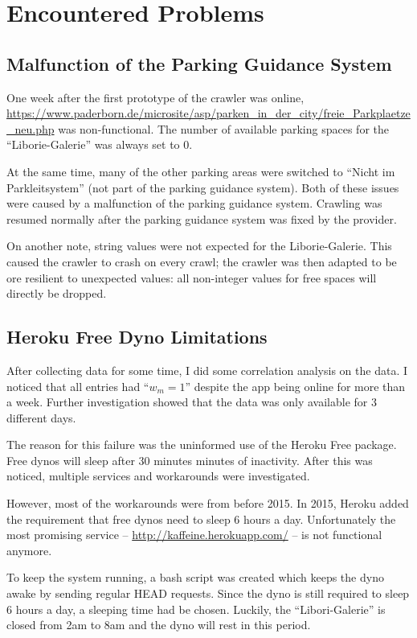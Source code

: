 \documentclass[journal,10pt]{IEEEtran}
\newcommand{\wom}{w_m}
\begin{document}
\section{Encountered Problems}
\subsection{Malfunction of the Parking Guidance System}
One week after the first prototype of the crawler was online, \url{https://www.paderborn.de/microsite/asp/parken_in_der_city/freie_Parkplaetze_neu.php} was non-functional. The number of available parking spaces for the ``Liborie-Galerie'' was always set to \(0\).

At the same time, many of the other parking areas were switched to ``Nicht im Parkleitsystem'' (not part of the parking guidance system). Both of these issues were caused by a malfunction of the parking guidance system. Crawling was resumed normally after the parking guidance system was fixed by the provider.

On another note, string values were not expected for the Liborie-Galerie. This caused the crawler to crash on every crawl; the crawler was then adapted to be ore resilient to unexpected values: all non-integer values for free spaces will directly be dropped.

\subsection{Heroku Free Dyno Limitations}

After collecting data for some time, I did some correlation analysis on the data. I noticed that all entries had ``\(\wom = 1\)'' despite the app being online for more than a week. Further investigation showed that the data was only available for 3 different days. 

The reason for this failure was the uninformed use of the Heroku Free package. Free dynos will sleep after 30 minutes minutes of inactivity. After this was noticed, multiple services and workarounds were investigated.

However, most of the workarounds were from before 2015. In 2015, Heroku added the requirement that free dynos need to sleep 6 hours a day. Unfortunately the most promising service -- \url{http://kaffeine.herokuapp.com/} -- is not functional anymore.

To keep the system running, a bash script was created which keeps the dyno awake by sending regular HEAD requests. Since the dyno is still required to sleep 6 hours a day, a sleeping time had be chosen. Luckily, the ``Libori-Galerie'' is closed from 2am to 8am and the dyno will rest in this period. 
\end{document}
